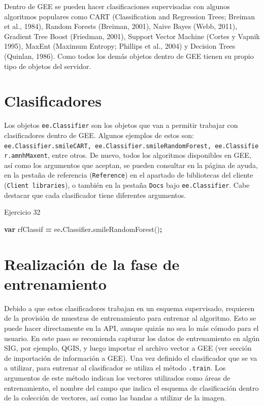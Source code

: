 \documentclass[
  12pt,
  letterpaper,
  twoside]{book}
\newenvironment{Shaded}{\begin{snugshade}}{\end{snugshade}}
\newcommand{\AttributeTok}[1]{\textcolor[rgb]{0.77,0.63,0.00}{#1}}
\newcommand{\FunctionTok}[1]{\textcolor[rgb]{0.00,0.00,0.00}{#1}}
\newcommand{\KeywordTok}[1]{\textcolor[rgb]{0.13,0.29,0.53}{\textbf{#1}}}
\newcommand{\NormalTok}[1]{#1}
\newcommand{\OperatorTok}[1]{\textcolor[rgb]{0.81,0.36,0.00}{\textbf{#1}}}
\begin{document}
Dentro de GEE se pueden hacer clasificaciones supervisadas con algunos algoritmos populares como CART (Classification and Regression Trees; Breiman et al., 1984), Random Forests (Breiman, 2001), Naive Bayes (Webb, 2011), Gradient Tree Boost (Friedman, 2001), Support Vector Machine (Cortes y Vapnik 1995), MaxEnt (Maximum Entropy; Phillips et al., 2004) y Decision Trees (Quinlan, 1986). Como todos los demás objetos dentro de GEE tienen su propio tipo de objetos del servidor.

\hypertarget{clasificadores}{%
\section{Clasificadores}\label{clasificadores}}

Los objetos \texttt{ee.Classifier} son los objetos que van a permitir trabajar con clasificadores dentro de GEE. Algunos ejemplos de estos son: \texttt{ee.Classifier.smileCART,\ ee.Classifier.smileRandomForest,\ ee.Classifier.amnhMaxent}, entre otros. De nuevo, todos los algoritmos disponibles en GEE, así como los argumentos que aceptan, se pueden consultar en la página de ayuda, en la pestaña de referencia (\texttt{Reference}) en el apartado de bibliotecas del cliente (\texttt{Client\ libraries}), o también en la pestaña \texttt{Docs} bajo \texttt{ee.Classifier}. Cabe destacar que cada clasificador tiene diferentes argumentos.

Ejercicio 32

\begin{Shaded}
\begin{Highlighting}[]
\KeywordTok{var}\NormalTok{ rfClassif }\OperatorTok{=}\NormalTok{ ee}\OperatorTok{.}\AttributeTok{Classifier}\OperatorTok{.}\FunctionTok{smileRandomForest}\NormalTok{()}\OperatorTok{;}
\end{Highlighting}
\end{Shaded}

\hypertarget{realizaciuxf3n-de-la-fase-de-entrenamiento}{%
\section{Realización de la fase de entrenamiento}\label{realizaciuxf3n-de-la-fase-de-entrenamiento}}

Debido a que estos clasificadores trabajan en un esquema supervisado, requieren de la provisión de muestras de entrenamiento para entrenar al algoritmo. Esto se puede hacer directamente en la API, aunque quizás no sea lo más cómodo para el usuario. En este paso se recomienda capturar los datos de entrenamiento en algún SIG, por ejemplo, QGIS, y luego importar el archivo vector a GEE (ver sección de importación de información a GEE). Una vez definido el clasificador que se va a utilizar, para entrenar al clasificador se utiliza el método \texttt{.train}. Los argumentos de este método indican los vectores utilizados como áreas de entrenamiento, el nombre del campo que indica el esquema de clasificación dentro de la colección de vectores, así como las bandas a utilizar de la imagen.
\end{document}
